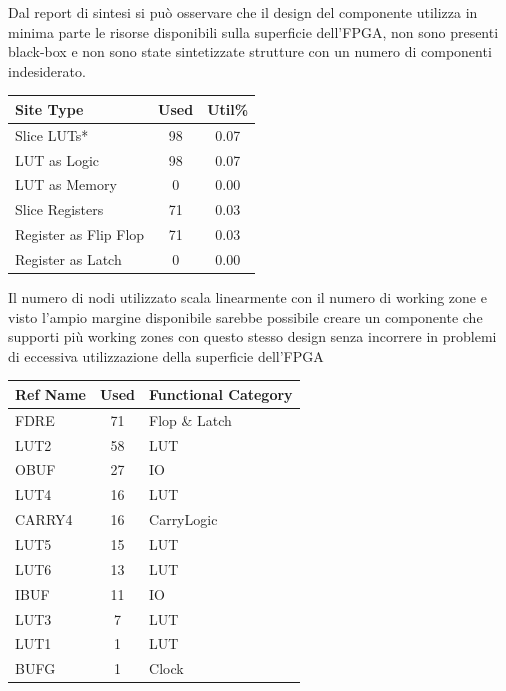 \documentclass[a4paper,twocolumn]{article}
\begin{document}
Dal report di sintesi si può osservare che il design del componente utilizza in minima parte le risorse disponibili sulla superficie dell'FPGA, non sono presenti black-box e non sono state sintetizzate strutture con un numero di componenti indesiderato.

\hspace{8em}

\begin{tabular}{|p{3.5cm}|c|c|}
\hline
\bf{Site Type}               & \bf{Used}  & \bf{Util\%} \\
\hline
Slice LUTs*             &   98  & 0.07 \\
\hline
  LUT as Logic          &   98  & 0.07 \\
\hline
  LUT as Memory         &    0  & 0.00 \\
\hline
Slice Registers         &   71  & 0.03 \\
\hline
  Register as Flip Flop &   71  & 0.03 \\
\hline
  Register as Latch     &    0  & 0.00 \\
\hline
\end{tabular}

\hspace{8em}

Il numero di nodi utilizzato scala linearmente con il numero di working zone e visto l'ampio margine disponibile sarebbe possibile creare un componente che supporti più working zones con questo stesso design senza incorrere in problemi di eccessiva utilizzazione della superficie dell'FPGA

\hspace{8em}

\begin{tabular}{|p{2cm}|c|p{2.2cm}|}
\hline
\bf{Ref Name}    &   \bf{Used} &  \bf{Functional Category} \\
\hline
FDRE        &     71 &         Flop \& Latch \\
\hline
LUT2        &     58 &                  LUT \\
\hline
OBUF        &     27 &                   IO \\
\hline
LUT4        &     16 &                  LUT \\
\hline
CARRY4      &     16 &           CarryLogic \\
\hline
LUT5        &     15 &                  LUT \\
\hline
LUT6        &     13 &                  LUT \\
\hline
IBUF        &     11 &                   IO \\
\hline
LUT3        &      7 &                  LUT \\
\hline
LUT1        &      1 &                  LUT \\
\hline
BUFG        &      1 &                Clock \\
\hline
\end{tabular}
\end{document}
